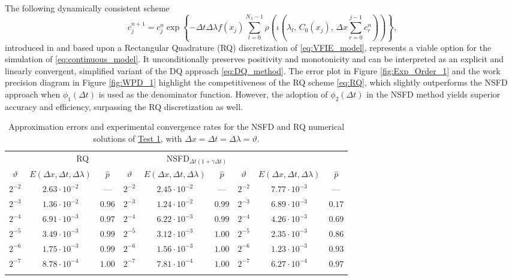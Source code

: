 \documentclass[a4paper, UKenglish, numberwithinsect, thm-restate]{tgdk-v2021}
\begin{document}
The following dynamically consistent scheme
\begin{equation}\label{eq:RQ}
    c_j^{n+1}=c_j^{n} \exp\left\{-\Delta t \Delta \lambda f(x_j) \sum_{l=0}^{N_\lambda -1} \rho\!\left( \! \iota \! \left(\lambda_l,\, C_0(x_j) ,\, \Delta x \! \sum_{r=0}^{j-1}c_r^{n}\right)\!\right) \right\},
\end{equation}
introduced in \cite{Ceseri_Natalini_Pezzella} and based upon a Rectangular Quadrature (RQ) discretization of \eqref{eq:VFIE_model}, represents a viable option for the simulation of \eqref{eq:continuous_model}. It unconditionally preserves positivity and monotonicity and can be interpreted as an explicit and linearly convergent, simplified variant of the DQ approach \eqref{eq:DQ_method}. The error plot in Figure \ref{fig:Exp_Order_1} and the work precision diagram in Figure \ref{fig:WPD_1} highlight the competitiveness of the RQ scheme \eqref{eq:RQ}, which slightly outperforms the NSFD approach when $\phi_1(\Delta t)$ is used as the denominator function. However, the adoption of $\phi_2(\Delta t)$ in the NSFD method yields superior accuracy and efficiency, surpassing the RQ discretization as well.

\begin{table}[htbp] \center 
\begin{tabular}{ccc|ccc|ccc}
\hline\noalign{\smallskip}
\multicolumn{3}{c|}{NSFD$_{\Delta t}$ } & \multicolumn{3}{|c}{RQ} & \multicolumn{3}{|c}{NSFD$_{\Delta t(1+\gamma\Delta t)}$}  \\
\noalign{\smallskip}\hline\noalign{\smallskip}
$\vartheta$ & $E(\Delta x, \Delta t, \Delta \lambda)$ & $\hat{p}$ & $\vartheta$ & $E(\Delta x, \Delta t, \Delta \lambda)$ & $\hat{p}$ & $\vartheta$ & $E(\Delta x, \Delta t, \Delta \lambda)$ & $\hat{p}$ \\
$2^{-2}$ & $2.63 \cdot 10^{-2}$ & --- & $2^{-2}$ & $2.45 \cdot 10^{-2}$ & --- & $2^{-2}$ & $7.77 \cdot 10^{-3}$ & --- \\
$2^{-3}$ & $1.36 \cdot 10^{-2}$ & $0.96$ & $2^{-3}$ & $1.24 \cdot 10^{-2}$ & $0.99$ & $2^{-3}$ & $6.89 \cdot 10^{-3}$ & $0.17$ \\
$2^{-4}$ & $6.91 \cdot 10^{-3}$ & $0.97$ & $2^{-4}$ & $6.22 \cdot 10^{-3}$ & $0.99$ & $2^{-4}$ & $4.26 \cdot 10^{-3}$ & $0.69$ \\
$2^{-5}$ & $3.49 \cdot 10^{-3}$ & $0.99$ & $2^{-5}$ & $3.12 \cdot 10^{-3}$ & $1.00$ & $2^{-5}$ & $2.35 \cdot 10^{-3}$ & $0.86$ \\
$2^{-6}$ & $1.75 \cdot 10^{-3}$ & $0.99$ & $2^{-6}$ & $1.56 \cdot 10^{-3}$ & $1.00$ & $2^{-6}$ & $1.23 \cdot 10^{-3}$ & $0.93$ \\
$2^{-7}$ & $8.78 \cdot 10^{-4}$ & $1.00$ & $2^{-7}$ & $7.81 \cdot 10^{-4}$ & $1.00$ & $2^{-7}$ & $6.27 \cdot 10^{-4}$ & $0.97$ \\
\noalign{\smallskip} \hline
\end{tabular}
\smallskip
\caption{Approximation errors and experimental convergence rates for the NSFD and RQ numerical solutions of \hyperref[defn: Test_1]{Test 1}, with $\Delta x = \Delta t = \Delta \lambda = \vartheta$.}
\label{tab:Test1_Err_I_ORDER}       %
\end{table}
\end{document}
